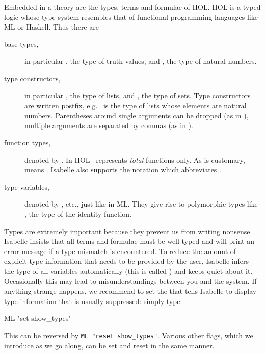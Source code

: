 Embedded in a theory are the types, terms and formulae of HOL\@. HOL is a typed
logic whose type system resembles that of functional programming languages
like ML or Haskell. Thus there are
\begin{description}
\item[base types,] in particular , the type of truth values,
and , the type of natural numbers.
\item[type constructors,] in particular , the type of
lists, and , the type of sets. Type constructors are written
postfix, e.g.\  is the type of lists whose elements are
natural numbers. Parentheses around single arguments can be dropped (as in
), multiple arguments are separated by commas (as in
).
\item[function types,] denoted by \isasymFun{}.
  In HOL \isasymFun\ represents \emph{total} functions only. As is customary,
   means
  . Isabelle also
  supports the notation 
  which abbreviates .
\item[type variables,]
  denoted by ,  etc., just like in ML\@. They give rise
  to polymorphic types like , the type of the identity
  function.
\end{description}
\begin{warn}
  Types are extremely important because they prevent us from writing
  nonsense.  Isabelle insists that all terms and formulae must be well-typed
  and will print an error message if a type mismatch is encountered. To
  reduce the amount of explicit type information that needs to be provided by
  the user, Isabelle infers the type of all variables automatically (this is
  called ) and keeps quiet about it. Occasionally
  this may lead to misunderstandings between you and the system. If anything
  strange happens, we recommend to set the 
   that tells Isabelle to display type information
  that is usually suppressed: simply type
\begin{ttbox}
ML "set show_types"
\end{ttbox}

\noindent
This can be reversed by \texttt{ML "reset show_types"}. Various other flags,
which we introduce as we go along,
can be set and reset in the same manner.
\end{warn}


